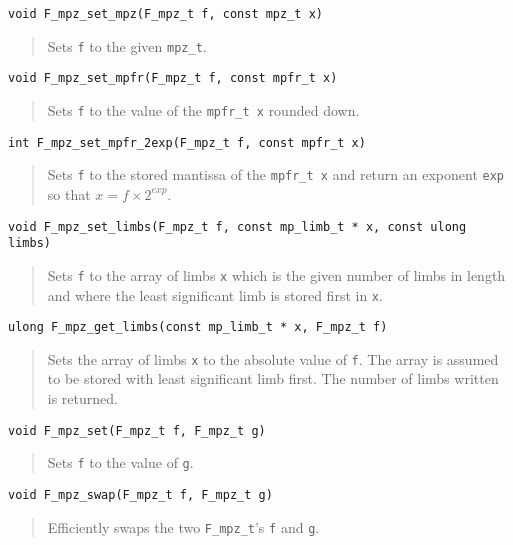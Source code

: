 \documentclass[a4paper,10pt]{article}
\newcommand{\code}{\lstinline}
\begin{document}
\begin{lstlisting}
void F_mpz_set_mpz(F_mpz_t f, const mpz_t x)
\end{lstlisting}
\begin{quote}
Sets \code{f} to the given \code{mpz_t}.
\end{quote}

\begin{lstlisting}
void F_mpz_set_mpfr(F_mpz_t f, const mpfr_t x)
\end{lstlisting}
\begin{quote}
Sets \code{f} to the value of the \code{mpfr_t x} rounded down.
\end{quote}

\begin{lstlisting}
int F_mpz_set_mpfr_2exp(F_mpz_t f, const mpfr_t x)
\end{lstlisting}
\begin{quote}
Sets \code{f} to the stored mantissa of the \code{mpfr_t x} and return an exponent \code{exp} so that $x = f\times 2^{exp}$.
\end{quote}

\begin{lstlisting}
void F_mpz_set_limbs(F_mpz_t f, const mp_limb_t * x, const ulong limbs)
\end{lstlisting}
\begin{quote}
Sets \code{f} to the array of limbs \code{x} which is the given number of limbs in length and where the least significant limb is stored first in \code{x}.
\end{quote}

\begin{lstlisting}
ulong F_mpz_get_limbs(const mp_limb_t * x, F_mpz_t f)
\end{lstlisting}
\begin{quote}
Sets the array of limbs \code{x} to the absolute value of \code{f}. The array is assumed to be stored with least significant limb first. The number of limbs written is returned.
\end{quote}

\begin{lstlisting}
void F_mpz_set(F_mpz_t f, F_mpz_t g)
\end{lstlisting}
\begin{quote}
Sets \code{f} to the value of \code{g}.
\end{quote}

\begin{lstlisting}
void F_mpz_swap(F_mpz_t f, F_mpz_t g)
\end{lstlisting}
\begin{quote}
Efficiently swaps the two \code{F_mpz_t}'s \code{f} and \code{g}. 
\end{quote}
\end{document}
